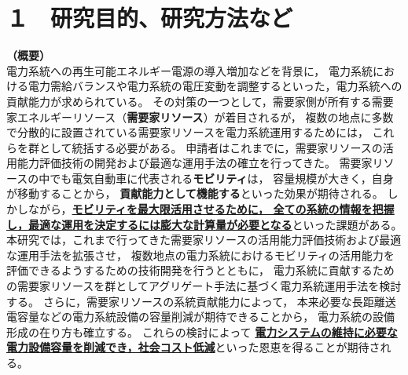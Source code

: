 \documentclass[11pt,a4paper,uplatex,dvipdfmx]{ujarticle} 		%
\newcommand{\研究課題名}{モビリティの時空間調整を活用した電力設備形成構築}
\newcommand{\研究機関名}{名古屋工業大学}
\newcommand{\研究代表者氏名}{中村勇太}
\newcommand{\研究期間の最終元号年度}{10}  %
\begin{document}

\section{１　研究目的、研究方法など}

\vspace{-0.5\baselineskip}           %
\noindent
\textbf{（概要）}\\
電力系統への再生可能エネルギー電源の導入増加などを背景に，
電力系統における電力需給バランスや電力系統の電圧変動を調整するといった，電力系統への貢献能力が求められている。
その対策の一つとして，需要家側が所有する需要家エネルギーリソース（\textbf{需要家リソース}）が着目されるが，
複数の地点に多数で分散的に設置されている需要家リソースを電力系統運用するためには，
これらを群として統括する必要がある。
申請者はこれまでに，需要家リソースの活用能力評価技術の開発および最適な運用手法の確立を行ってきた。
需要家リソースの中でも電気自動車に代表される\textbf{モビリティ}は，
容量規模が大きく，自身が移動することから，
\textbf{貢献能力として機能する}といった効果が期待される。
しかしながら，\textbf{\ul{モビリティを最大限活用させるために，
全ての系統の情報を把握し，最適な運用を決定するには膨大な計算量が必要となる}}といった課題がある。
本研究では，これまで行ってきた需要家リソースの活用能力評価技術および最適な運用手法を拡張させ，
複数地点の電力系統におけるモビリティの活用能力を評価できるようするための技術開発を行うとともに，%
電力系統に貢献するための需要家リソースを群としてアグリゲート手法に基づく電力系統運用手法を検討する。%
さらに，需要家リソースの系統貢献能力によって，%
本来必要な長距離送電容量などの電力系統設備の容量削減が期待できることから，
電力系統の設備形成の在り方も確立する。%
これらの検討によって%
\textbf{\ul{電力システムの維持に必要な電力設備容量を削減でき，社会コスト低減}}といった恩恵を得ることが期待される。
\end{document}
